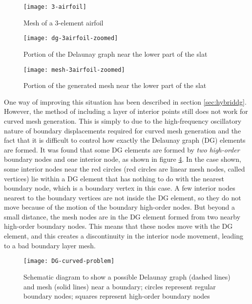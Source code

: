 \begin{figure}
	\centering
	\texttt{[image: 3-airfoil]}
	\caption{Mesh of a 3-element airfoil}
	\label{fig:wmesh}
\end{figure}
\begin{figure}
	\centering
	\texttt{[image: dg-3airfoil-zoomed]}
	\caption{Portion of the Delaunay graph near the lower part of the slat}
	\label{fig:wmesh-dg}
\end{figure}
\begin{figure}
	\centering
	\texttt{[image: mesh-3airfoil-zoomed]}
	\caption{Portion of the generated mesh near the lower part of the slat}
	\label{fig:wmesh-zoomed}
\end{figure}

One way of improving this situation has been described in section \ref{sec:hybriddg}. However, the method of including a layer of interior points still does not work for curved mesh generation. This is simply to due to the high-frequency oscillatory nature of boundary displacements required for curved mesh generation and the fact that it is difficult to control how exactly the Delaunay graph (DG) elements are formed. It was found that some DG elements are formed by \emph{two high-order} boundary nodes and one interior node, as shown in figure \ref{fig:dg-curved-problem}. In the case shown, some interior nodes near the red circles (red circles are linear mesh nodes, called vertices) lie within a DG element that has nothing to do with the nearest boundary node, which is a boundary vertex in this case. A few interior nodes nearest to the boundary vertices are not inside the DG element, so they do not move because of the motion of the boundary high-order nodes. But beyond a small distance, the mesh nodes are in the DG element formed from two nearby high-order boundary nodes. This means that these nodes move with the DG element, and this creates a discontinuity in the interior node movement, leading to a bad boundary layer mesh.
\begin{figure}[!h]
	\centering
	\texttt{[image: DG-curved-problem]}
	\caption{Schematic diagram to show a possible Delaunay graph (dashed lines) and mesh (solid lines) near a boundary; circles represent regular boundary nodes; squares represent high-order boundary nodes}
	\label{fig:dg-curved-problem}
\end{figure}